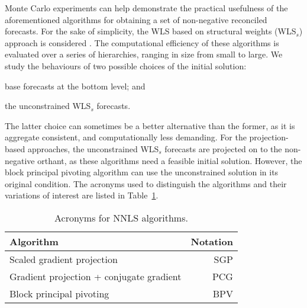 \documentclass[twocolumn]{svjour3}
\begin{document}
Monte Carlo experiments can help demonstrate the practical usefulness of the aforementioned algorithms for obtaining a set of non-negative reconciled forecasts. For the sake of simplicity, the WLS based on structural weights (WLS$_{s}$) approach is considered \citep{Wick2018}. The computational efficiency of these algorithms is evaluated over a series of hierarchies, ranging in size from small to large. We study the behaviours of two possible choices of the initial solution: \begin{inparaenum}[(i)] \item base forecasts at the bottom level; and \item the unconstrained WLS$_{s}$ forecasts. \end{inparaenum} The latter choice can sometimes be a better alternative than the former, as it is aggregate consistent, and computationally less demanding. For the projection-based approaches, the unconstrained WLS$_{s}$ forecasts are projected on to the non-negative orthant, as these algorithms need a feasible initial solution. However, the block principal pivoting algorithm can use the unconstrained solution in its original condition. The acronyms used to distinguish the algorithms and their variations of interest are listed in Table~\ref{tbl:acronn}.

\begin{table}[ht]
	\centering
	\tabcolsep=0.16cm
	\caption{Acronyms for NNLS algorithms.}
	\label{tbl:acronn}
	\begin{tabular}{lr}
		\toprule
		Algorithm                                & Notation \\
		\midrule
		Scaled gradient projection               & SGP      \\[0.1cm]
		Gradient projection + conjugate gradient & PCG      \\[0.1cm]
		Block principal pivoting                 & BPV      \\
		\bottomrule
	\end{tabular}
\end{table}
\end{document}
